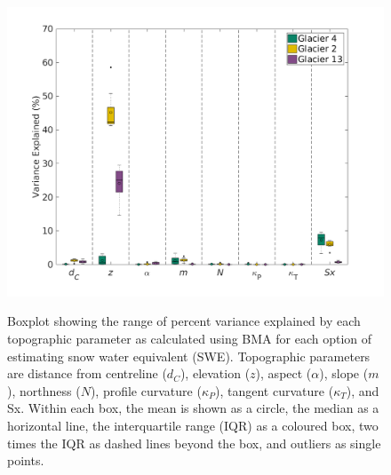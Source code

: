 \documentclass[12pt]{article}
\newcommand{\params}{Topographic parameters are distance from centreline ($d_C$), elevation ($z$), aspect ($\alpha$), slope ($m$), northness ($N$), profile curvature ($\kappa_P$), tangent curvature ($\kappa_T$), and Sx. }
\newcommand{\boxplot}{Within each box, the mean is shown as a circle, the median as a horizontal line, the interquartile range (IQR) as a coloured box, two times the IQR as dashed lines beyond the box, and outliers as single points. }
\begin{document}
\begin{figure}[H]
	\centering
	\includegraphics[width = 1.1 \textwidth]{BMSCoeffs_DensityOpts.png}\\
	\caption{Boxplot showing the range of percent variance explained by each topographic parameter as calculated using BMA for each option of estimating snow water equivalent (SWE). \params \boxplot}
	\label{fig:BMSPercentVar_densityOptions}
\end{figure} 
\end{document}
